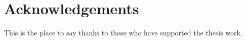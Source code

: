 \chapter*{Acknowledgements}

This is the place to say thanks to those who have supported the thesis work.